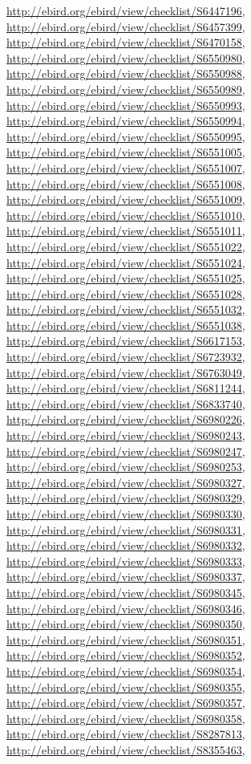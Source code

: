 \documentclass[9pt, article]{memoir}
\begin{document}
\begin{multicols}{2}
\url{http://ebird.org/ebird/view/checklist/S6447196}, 
\url{http://ebird.org/ebird/view/checklist/S6457399}, 
\url{http://ebird.org/ebird/view/checklist/S6470158}, 
\url{http://ebird.org/ebird/view/checklist/S6550980}, 
\url{http://ebird.org/ebird/view/checklist/S6550988}, 
\url{http://ebird.org/ebird/view/checklist/S6550989}, 
\url{http://ebird.org/ebird/view/checklist/S6550993}, 
\url{http://ebird.org/ebird/view/checklist/S6550994}, 
\url{http://ebird.org/ebird/view/checklist/S6550995}, 
\url{http://ebird.org/ebird/view/checklist/S6551005}, 
\url{http://ebird.org/ebird/view/checklist/S6551007}, 
\url{http://ebird.org/ebird/view/checklist/S6551008}, 
\url{http://ebird.org/ebird/view/checklist/S6551009}, 
\url{http://ebird.org/ebird/view/checklist/S6551010}, 
\url{http://ebird.org/ebird/view/checklist/S6551011}, 
\url{http://ebird.org/ebird/view/checklist/S6551022}, 
\url{http://ebird.org/ebird/view/checklist/S6551024}, 
\url{http://ebird.org/ebird/view/checklist/S6551025}, 
\url{http://ebird.org/ebird/view/checklist/S6551028}, 
\url{http://ebird.org/ebird/view/checklist/S6551032}, 
\url{http://ebird.org/ebird/view/checklist/S6551038}, 
\url{http://ebird.org/ebird/view/checklist/S6617153}, 
\url{http://ebird.org/ebird/view/checklist/S6723932}, 
\url{http://ebird.org/ebird/view/checklist/S6763049}, 
\url{http://ebird.org/ebird/view/checklist/S6811244}, 
\url{http://ebird.org/ebird/view/checklist/S6833740}, 
\url{http://ebird.org/ebird/view/checklist/S6980226}, 
\url{http://ebird.org/ebird/view/checklist/S6980243}, 
\url{http://ebird.org/ebird/view/checklist/S6980247}, 
\url{http://ebird.org/ebird/view/checklist/S6980253}, 
\url{http://ebird.org/ebird/view/checklist/S6980327}, 
\url{http://ebird.org/ebird/view/checklist/S6980329}, 
\url{http://ebird.org/ebird/view/checklist/S6980330}, 
\url{http://ebird.org/ebird/view/checklist/S6980331}, 
\url{http://ebird.org/ebird/view/checklist/S6980332}, 
\url{http://ebird.org/ebird/view/checklist/S6980333}, 
\url{http://ebird.org/ebird/view/checklist/S6980337}, 
\url{http://ebird.org/ebird/view/checklist/S6980345}, 
\url{http://ebird.org/ebird/view/checklist/S6980346}, 
\url{http://ebird.org/ebird/view/checklist/S6980350}, 
\url{http://ebird.org/ebird/view/checklist/S6980351}, 
\url{http://ebird.org/ebird/view/checklist/S6980352}, 
\url{http://ebird.org/ebird/view/checklist/S6980354}, 
\url{http://ebird.org/ebird/view/checklist/S6980355}, 
\url{http://ebird.org/ebird/view/checklist/S6980357}, 
\url{http://ebird.org/ebird/view/checklist/S6980358}, 
\url{http://ebird.org/ebird/view/checklist/S8287813}, 
\url{http://ebird.org/ebird/view/checklist/S8355463}, 

\end{multicols}
\end{document}
